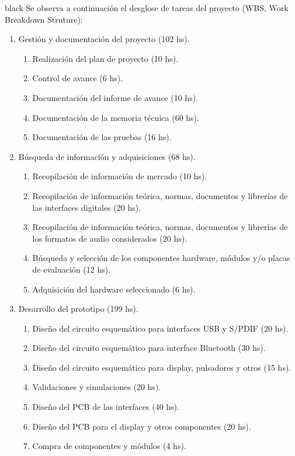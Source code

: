 \documentclass[
11pt, %
]{charter}
\begin{document}
\begin{consigna}{black}
Se observa a continuación el desglose de tareas del proyecto (WBS, Work Breakdown Struture):

\begin{enumerate}
\item Gestión y documentación del proyecto (102 hs).
	\begin{enumerate}
	\item Realización del plan de proyecto (10 hs).
	\item Control de avance (6 hs).
	\item Documentación del informe de avance (10 hs).
	\item Documentación de la memoria técnica (60 hs).
	\item Documentación de las pruebas (16 hs).
	\end{enumerate}
\item Búsqueda de información y adquisiciones (68 hs).
	\begin{enumerate}
	\item Recopilación de información de mercado (10 hs).
	\item Recopilación de información teórica, normas, documentos y librerías de las interfaces digitales (20 hs).
	\item Recopilación de información teórica, normas, documentos y librerías de los formatos de audio considerados (20 hs).
	\item Búsqueda y selección de los componentes hardware, módulos y/o placas de evaluación (12 hs).
	\item Adquisición del hardware seleccionado (6 hs).
	\end{enumerate}
\item Desarrollo del prototipo (199 hs). 
	\begin{enumerate}
	\item Diseño del circuito esquemático para interfaces USB y S/PDIF (20 hs).
	\item Diseño del circuito esquemático para interface Bluetooth (30 hs).
	\item Diseño del circuito esquemático para display, pulsadores y otros (15 hs).
	\item Validaciones y simulaciones (20 hs). 
	\item Diseño del PCB de las interfaces (40 hs).
	\item Diseño del PCB para el display y otros componentes (20 hs).
	\item Compra de componentes y módulos (4 hs).

\end{enumerate}
\end{enumerate}
\end{consigna}
\end{document}

